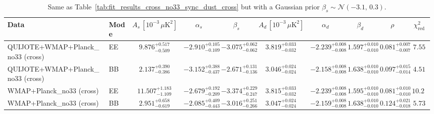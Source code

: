 \begin{table}[h]
\centering
\scriptsize
\setlength{\tabcolsep}{4pt}
\caption{Same as Table~\ref{tab:fit_results_cross_no33_sync_dust_cross} but with a Gaussian prior $\beta_s \sim \mathcal{N}(-3.1,\,0.3)$.}
\label{tab:fit_results_cross_no33_sync_dust_cross_prior_betas}
\begin{tabular}{llcccccccc}
\toprule
Data & Mode & $A_s\,[10^{-3}\,\mu\mathrm{K}^2]$ & $\alpha_s$ & $\beta_s$ & $A_d\,[10^{-3}\,\mu\mathrm{K}^2]$ & $\alpha_d$ & $\beta_d$ & $\rho$ & $\chi^2_\mathrm{red}$ \\
\midrule
QUIJOTE+WMAP+Planck\_no33 (cross) & EE & $9.876^{+0.517}_{-0.509}$ & $-2.910^{+0.105}_{-0.109}$ & $-3.075^{+0.062}_{-0.062}$ & $3.819^{+0.033}_{-0.032}$ & $-2.239^{+0.008}_{-0.008}$ & $1.597^{+0.010}_{-0.010}$ & $0.081^{+0.007}_{-0.007}$ & $7.55$ \\
QUIJOTE+WMAP+Planck\_no33 (cross) & BB & $2.137^{+0.390}_{-0.386}$ & $-3.152^{+0.388}_{-0.437}$ & $-2.671^{+0.131}_{-0.136}$ & $3.046^{+0.024}_{-0.024}$ & $-2.158^{+0.008}_{-0.008}$ & $1.638^{+0.010}_{-0.010}$ & $0.097^{+0.015}_{-0.014}$ & $4.51$ \\
WMAP+Planck\_no33 (cross) & EE & $11.507^{+1.183}_{-1.109}$ & $-2.679^{+0.192}_{-0.209}$ & $-3.374^{+0.229}_{-0.247}$ & $3.815^{+0.033}_{-0.032}$ & $-2.239^{+0.008}_{-0.008}$ & $1.595^{+0.010}_{-0.010}$ & $0.081^{+0.010}_{-0.010}$ & $10.22$ \\
WMAP+Planck\_no33 (cross) & BB & $2.951^{+0.658}_{-0.619}$ & $-2.085^{+0.409}_{-0.443}$ & $-3.016^{+0.251}_{-0.266}$ & $3.047^{+0.024}_{-0.024}$ & $-2.159^{+0.008}_{-0.008}$ & $1.638^{+0.010}_{-0.010}$ & $0.124^{+0.021}_{-0.018}$ & $5.73$ \\
\bottomrule
\end{tabular}
\end{table}
